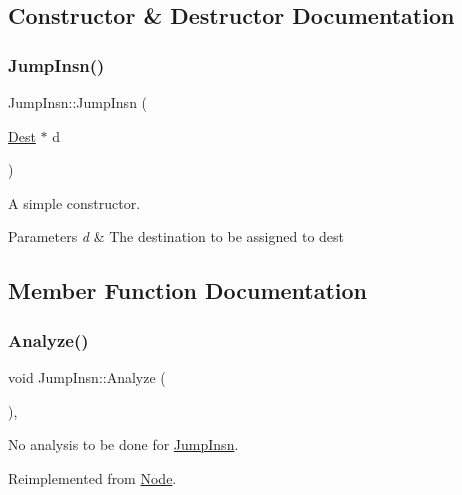 \subsection{Constructor \& Destructor Documentation}
\mbox{\label{class_jump_insn_a4f55c2e6f2698ba3dcf954b9668bf3c0}} 
\subsubsection{\texorpdfstring{Jump\+Insn()}{JumpInsn()}}
{\footnotesize\ttfamily Jump\+Insn\+::\+Jump\+Insn (\begin{DoxyParamCaption}\item[{\hyperlink{class_dest}{Dest} $\ast$}]{d }\end{DoxyParamCaption})}

A simple constructor. 
\begin{DoxyParams}{Parameters}
{\em d} & The destination to be assigned to dest \\
\hline
\end{DoxyParams}


\subsection{Member Function Documentation}
\mbox{\label{class_jump_insn_a2173add8387a3b8bb0e5813942e42b38}} 
\subsubsection{\texorpdfstring{Analyze()}{Analyze()}}
{\footnotesize\ttfamily void Jump\+Insn\+::\+Analyze (\begin{DoxyParamCaption}{ }\end{DoxyParamCaption})\hspace{0.3cm}{\ttfamily [inline]}, {\ttfamily [virtual]}}

No analysis to be done for \hyperlink{class_jump_insn}{Jump\+Insn}. 

Reimplemented from \hyperlink{class_node_a5f88d55c6f253a29def7ccc443d83d47}{Node}.

\mbox{\label{class_jump_insn_aadcff8ad57eb8c6597b355f1118a23dc}} 
